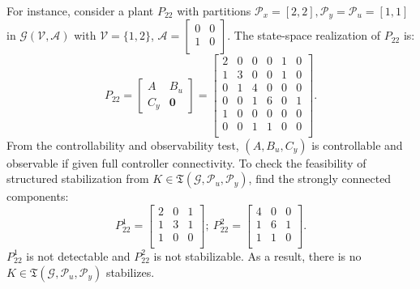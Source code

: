 For instance, consider a plant \(P_{22}\) with partitions \(\mathcal{P}_x = [2,2],\mathcal{P}_y =\mathcal{P}_u = [1,1]\) in \(\mathcal{G}(\mathcal{V}, \mathcal{A})\) with \(\mathcal{V} =\{1,2\}\), \(\mathcal{A} = \begin{bmatrix}
    0 & 0 \\
    1 & 0 \\
\end{bmatrix}\).
The state-space realization of \(P_{22}\) is:
\begin{equation}
    P_{22}= \left[\begin{array}{c|c}
        A & B_u \\
        \hline
        C_y & \mathbf{0}
    \end{array}\right]
    =
    \left[\begin{array}{cccc|cc}
        2 & 0 & 0 & 0 & 1 & 0 \\
        1 & 3 & 0 & 0 & 1 & 0 \\
        0 & 1 & 4 & 0 & 0 & 0 \\
        0 & 0 & 1 & 6 & 0 & 1 \\
        \hline
        1 & 0 & 0 & 0 & 0 & 0 \\
        0 & 0 & 1 & 1 & 0 & 0\\
    \end{array}\right].
\end{equation}
From the controllability and observability test, \((A, B_u, C_y)\) is controllable and observable if given full controller connectivity.
To check the feasibility of structured stabilization from \(K \in \mathfrak{T}(\mathcal{G},\mathcal{P}_u,\mathcal{P}_y)\), find the strongly connected components:
\begin{equation*}
    P_{{22}}^1
    =
    \left[\begin{array}{cc|c}
        2 & 0 & 1 \\
        1 & 3 & 1 \\
        \hline        
        1 & 0 & 0 \\
    \end{array}\right];\ 
    P_{{22}}^2
    =
    \left[\begin{array}{cc|c}
        4 & 0 & 0 \\
        1 & 6 & 1 \\
        \hline        
        1 & 1 & 0 \\
    \end{array}\right].
\end{equation*}
\(P_{{22}}^1\) is not detectable and \(P_{{22}}^2\) is not stabilizable. As a result, there is no \(K \in \mathfrak{T}(\mathcal{G},\mathcal{P}_u,\mathcal{P}_y)\) stabilizes.

